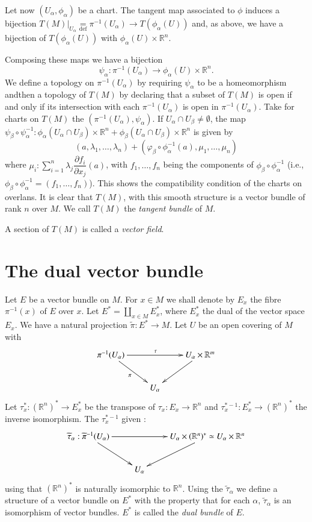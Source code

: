 Let now $(U_{\alpha},\phi_{\alpha})$ be a chart. The tangent map associated to $\phi$ induces a bijection $T(M)|_{U_{\alpha}}{\displaystyle{\mathop{=}\limits_{\text{def}}}}\pi^{-1}(U_{\alpha})\to T(\phi_{\alpha}(U))$ and, as above, we have a bijection of $T(\phi_{\alpha}(U))$ with $\phi_{\alpha}(U)\times \mathbb{R}^{n}$.

Composing these maps we have a bijection
$$
\psi_{\alpha} : \pi^{-1}(U_{\alpha})\to \phi_{\alpha}(U)\times \mathbb{R}^{n}.
$$
We define a topology on $\pi^{-1}(U_{\alpha})$ by requiring $\psi_{\alpha}$ to be a homeomorphism and\pageoriginale then a topology of $T(M)$ by declaring that a subset of $T(M)$ is open if and only if its intersection with each $\pi^{-1}(U_{\alpha})$ is open in $\pi^{-1}(U_{\alpha})$. Take for charts on $T(M)$ the $(\pi^{-1}(U_{\alpha}),\psi_{\alpha})$. If $U_{\alpha}\cap U_{\beta}\neq \emptyset$, the map $\psi_{\beta}\circ \psi^{-1}_{\alpha}:\phi_{\alpha}(U_{\alpha}\cap U_{\beta})\times \mathbb{R}^{n}+\phi_{\beta}(U_{\alpha}\cap U_{\beta})\times \mathbb{R}^{n}$ is given by 
$$
(a,\lambda_{1},\ldots,\lambda_{n})+(\varphi_{\beta}\circ \phi^{-1}_{\alpha}(a),\mu_{1},\ldots,\mu_{n})
$$
where $\mu_{i}:\sum\limits^{n}_{i=1}\lambda_{j}\dfrac{\partial f_{i}}{\partial x_{j}}(a)$, with $f_{1},\ldots,f_{n}$ being the components of $\phi_{\beta}\circ \phi^{-1}_{\alpha}$ (i.e., $\phi_{\beta}\circ \phi^{-1}_{\alpha}=(f_{1},\ldots,f_{n})$). This shows the compatibility condition of the charts on overlans. It is clear that $T(M)$, with this smooth structure is a vector bundle of rank $n$ over $M$. We call $T(M)$ the {\em tangent bundle} of $M$.

A section of $T(M)$ is called a {\em vector field}.

\section*{The dual vector bundle}

Let $E$ be a vector bundle on $M$. For $x\in M$ we shall denote by $E_{x}$ the fibre $\pi^{-1}(x)$ of $E$ over $x$. Let $E^{*}=\coprod\limits_{x\in M}E^{*}_{x}$, where $E^{*}_{x}$ the dual of the vector space $E_{x}$. We have a natural projection $\widetilde{\pi}:E^{*}\to M$. Let $U$ be an open covering of $M$ with 
\[
\xymatrix{
\pi^{-1}(U_{\alpha})\ar[dr]_{\pi}\ar[rr]^{\tau} & & U_{\alpha}\times \mathbb{R}^{m}\ar[dl]\\
 & U_{\alpha}
}
\]
Let $\tau^{*}_{x}:(\mathbb{R}^{n})^{*}\to E^{*}_{x}$ be the transpose of $\tau_{x}:E_{x}\to \mathbb{R}^{n}$ and $\tau^{*-1}_{x}:E^{*}_{x}\to (\mathbb{R}^{n})^{*}$ the inverse isomorphism. The $\tau^{*-1}_{x}$ given :
\[
\xymatrix{
\widetilde{\tau}_{\alpha}:\widetilde{\pi}^{-1}(U_{\alpha})\ar[dr]\ar[rr] & & U_{\alpha}\times (\mathbb{R}^{n})^{*}\simeq U_{\alpha}\times \mathbb{R}^{n}\ar[dl]\\
 & U_{\alpha} &
}
\]\pageoriginale
using that $(\mathbb{R}^{n})^{*}$ is naturally isomorphic to $\mathbb{R}^{n}$. Using the $\widetilde{\tau}_{\alpha}$ we define a structure of a vector bundle on $E^{*}$ with the property that for each $\alpha$, $\widetilde{\tau}_{\alpha}$ is an isomorphism of vector bundles. $E^{*}$ is called the {\em dual bundle} of $E$.


